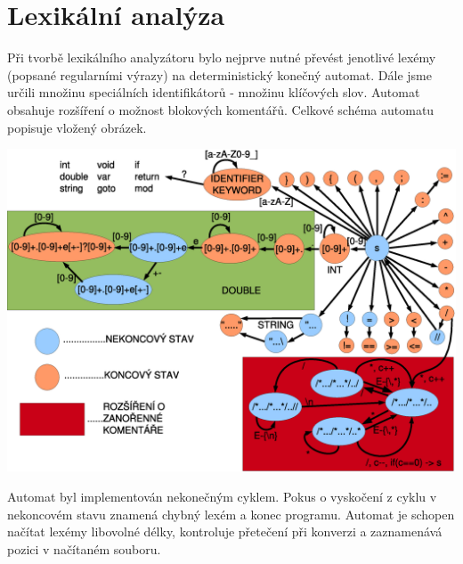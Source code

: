\section{Lexikální analýza}

Při tvorbě lexikálního analyzátoru bylo nejprve nutné převést jenotlivé lexémy (popsané regularními výrazy) na deterministický konečný automat. Dále jsme určili množinu speciálních identifikátorů - množinu klíčových slov. Automat obsahuje rozšíření o možnost blokových komentářů. Celkové schéma automatu popisuje vložený obrázek.

\begin{center}
 \includegraphics[scale=0.5]{include/scanner.eps}
\end{center}

Automat byl implementován nekonečným cyklem. Pokus o vyskočení z cyklu v nekoncovém stavu znamená chybný lexém a konec programu. Automat je schopen načítat lexémy libovolné délky, kontroluje přetečení při konverzi a zaznamenává pozici v načítaném souboru.
